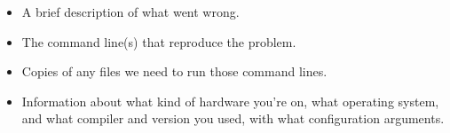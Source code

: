 \begin{itemize}
 \item A brief description of what went wrong.
 \item The command line(s) that reproduce the problem.
 \item Copies of any files we need to run those command lines.
 \item Information about what kind of hardware you're on, what
   operating system, and what compiler and version you used, with what
   configuration arguments.
\end{itemize}



